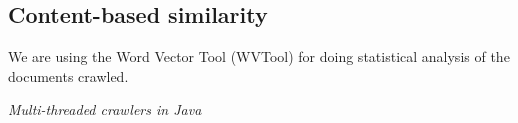 \documentclass{article}
\begin{document}
\subsection{Content-based similarity}
We are using the Word Vector Tool (WVTool) for doing statistical
analysis of the documents crawled.

\begin{thebibliography}{9}

	  
	  \emph{Multi-threaded crawlers in Java} 

\end{thebibliography}
\end{document}
